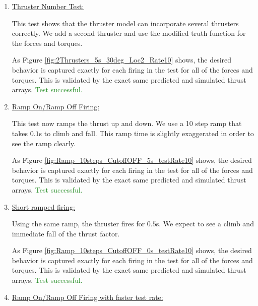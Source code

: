 \begin{enumerate}
	\item{\underline{Thruster Number Test:} }
	
	
	
	This test shows that the thruster model can incorporate several thrusters correctly. We add a second thruster and use the modified truth function for the forces and torques.
	
	
	
	As Figure \ref{fig:2Thrusters_5s_30deg_Loc2_Rate10} shows, the desired behavior is captured exactly for each 
	firing in the test for all of the forces and torques. This is validated by the exact same predicted and simulated thrust arrays.  \textcolor{ForestGreen}{Test successful.}
	
	\item{\underline{Ramp On/Ramp Off Firing:} }
	
	
	
	This test now ramps the thrust up and down. We use a 10 step ramp that takes $0.1$s to climb and fall. This ramp time is slightly exaggerated in order to see the ramp clearly.      
	
	
	As Figure \ref{fig:Ramp_10steps_CutoffOFF_5s_testRate10} shows, the desired behavior is captured exactly for each 
	firing in the test for all of the forces and torques. This is validated by the exact same predicted and simulated thrust arrays. \textcolor{ForestGreen}{Test successful.}
	
	
	\item{\underline{Short ramped firing:} }
	
	
	
	Using the same ramp, the thruster fires for $0.5$s. We expect to see a climb and immediate fall of the thrust factor.
	
	
	
	As Figure \ref{fig:Ramp_10steps_CutoffOFF_0s_testRate10} shows, the desired behavior is captured exactly for each 
	firing in the test for all of the forces and torques. This is validated by the exact same predicted and simulated thrust arrays. \textcolor{ForestGreen}{Test successful.}
	
	\item{\underline{Ramp On/Ramp Off Firing with faster test rate:} }
	

\end{enumerate}
